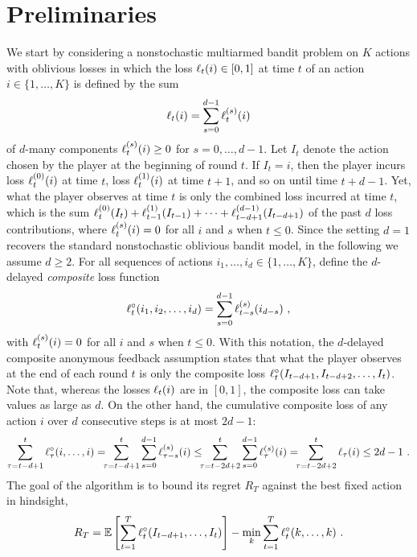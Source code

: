 \newcommand{\lcomp}{\loss^{\circ}}
\section{Preliminaries}\label{s:prel}
%
We start by considering a nonstochastic multiarmed bandit problem on
$K$ actions with oblivious losses in which the loss $\ell_t(i) \in
[0,1]$ at time $t$ of an action $i \in \{1,\ldots, K\}$ is defined
by the sum
\[
  \ell_t(i) = \sum_{s=0}^{d-1} \ell_t^{(s)}(i)
\]
of $d$-many components $\ell_t^{(s)}(i) \ge 0$ for $s=0,\dots,d-1$.
Let $I_t$ denote the action chosen by the player at the
beginning of round $t$. If $I_t = i$, then the player incurs loss
$\ell_t^{(0)}(i)$ at time $t$, loss $\ell_t^{(1)}(i)$ at time $t+1$,
and so on until time $t+d-1$.
Yet, what the player observes at time $t$ is only the combined loss incurred at time $t$, which is the sum
$
\ell_{t}^{(0)}(I_{t}) + \ell_{t-1}^{(1)}(I_{t-1}) + \cdots + \ell_{t-d+1}^{(d-1)}(I_{t-d+1})
$
of the past $d$ loss contributions, where $\ell_t^{(s)}(i) = 0$ for all $i$ and $s$ when $t \le 0$. Since the setting $d=1$ recovers the standard nonstochastic oblivious bandit model, in the following we assume $d \ge 2$. For all sequences of actions $i_1, \ldots, i_d \in \{1,\ldots,K\}$, define the $d$-delayed {\em composite} loss function
%
\begin{equation}\label{e:mixedloss}
    \lcomp_t(i_1,i_2,\dots,i_d) = \sum_{s=0}^{d-1} \loss_{t-s}^{(s)}(i_{d-s})~,
\end{equation}
%
with $\ell_t^{(s)}(i) = 0$ for all $i$ and $s$ when $t \le 0$. With this notation, the $d$-delayed composite anonymous feedback assumption states that what the player observes at the end of each round $t$ is only the composite loss
$
\lcomp_t(I_{t-d+1},I_{t-d+2},\dots,I_t)
$.
Note that, whereas the losses $\ell_t(i)$ are in $[0,1]$, the composite loss can take values as large as $d$. On the other hand, the cumulative composite loss of any action $i$ over $d$ consecutive steps is at most $2d-1$:
\begin{equation}
\label{eq:compsum}
    \sum_{\tau=t-d+1}^t \lcomp_{\tau}(i,\dots,i)
=\!\!\!
    \sum_{\tau=t-d+1}^t \sum_{s=0}^{d-1} \loss_{\tau-s}^{(s)}(i)
\leq\!\!\!
    \sum_{\tau=t-2d+2}^t \sum_{s=0}^{d-1}\loss_{\tau}^{(s)}(i)
=\!\!\!
    \sum_{\tau=t-2d+2}^t \loss_{\tau}(i)
\le
    2d-1~.
\end{equation}
The goal of the algorithm is to bound its regret $R_T$ against the best fixed action in hindsight,
\[
R_T =\E\left[\sum_{t=1}^T \lcomp_t(I_{t-d+1},\dots,I_t)\right] -
\min_k \sum_{t=1}^T \lcomp_t(k,\dots,k)~.
\]

